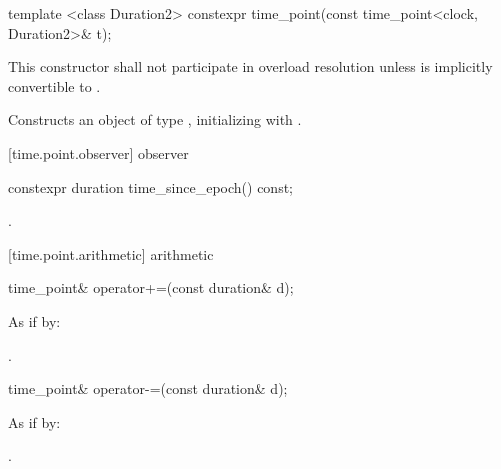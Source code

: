 %
\begin{itemdecl}
template <class Duration2>
  constexpr time_point(const time_point<clock, Duration2>& t);
\end{itemdecl}

\begin{itemdescr}
\pnum
\remarks This constructor shall not participate in overload resolution unless 
is implicitly convertible to .

\pnum
\effects Constructs an object of type , initializing
 with .
\end{itemdescr}

[time.point.observer]{ observer}

%
%
\begin{itemdecl}
constexpr duration time_since_epoch() const;
\end{itemdecl}

\begin{itemdescr}
\pnum
\returns {}.
\end{itemdescr}

[time.point.arithmetic]{ arithmetic}

%
%
\begin{itemdecl}
time_point& operator+=(const duration& d);
\end{itemdecl}

\begin{itemdescr}
\pnum
\effects As if by: 

\pnum
\returns {}.
\end{itemdescr}

%
%
\begin{itemdecl}
time_point& operator-=(const duration& d);
\end{itemdecl}

\begin{itemdescr}
\pnum
\effects As if by: 

\pnum
\returns {}.
\end{itemdescr}


